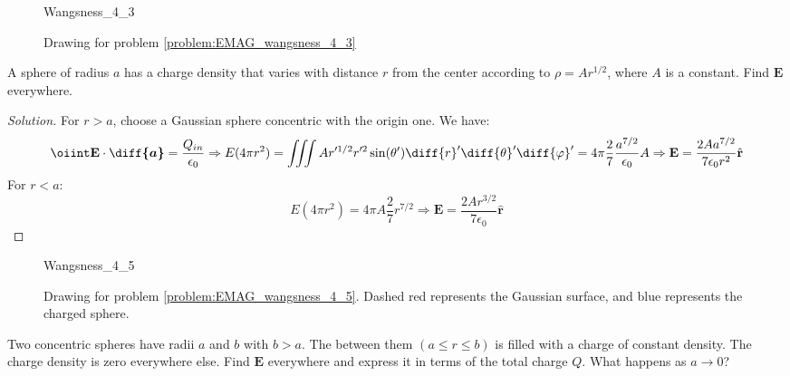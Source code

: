 \documentclass[crop=false,class=article,oneside]{standalone}
\begin{document}
    \begin{figure}
        \centering
        \captionsetup{type=figure}
        {Wangsness_4_3}
        \caption[Drawing for Wangsness 4-3]
        {Drawing for problem \ref{problem:EMAG_wangsness_4_3}}
        \label{fig:EMAG_1_Wangsness_4_3}
    \end{figure}
    \begin{problem}[Wangsness 4-5]
        \label{problem:EMAG_wangsness_4_5}
        A sphere of radius $a$ has a charge density that varies
        with distance $r$ from the center according to
        $\rho=Ar^{1/2}$, where $A$ is a constant.
        Find $\mathbf{E}$ everywhere.
    \end{problem}
    \begin{proof}[Solution]
        For $r>a$, choose a Gaussian sphere concentric with
        the origin one. We have:
        \begin{equation*}
            \oiint\mathbf{E}\cdot\boldsymbol{\diff{a}}
            =\frac{Q_{in}}{\epsilon_{0}}\Rightarrow
            E(4\pi r^{2})
            =\iiint{A}r'^{1/2}r'^{2}
            \sin(\theta')\diff{r}'\diff{\theta}'\diff{\varphi}'
            =4\pi\frac{2}{7}\frac{a^{7/2}}{\epsilon_{0}}A
            \Rightarrow\mathbf{E}
            =\frac{2Aa^{7/2}}{7\epsilon_{0}r^{2}}\hat{\mathbf{r}}
        \end{equation*}
        For $r<a$:
        \begin{equation*}
            E(4\pi r^{2})
            =4\pi A\frac{2}{7}r^{7/2}\Rightarrow
            \mathbf{E}
            =\frac{2Ar^{3/2}}{7\epsilon_{0}}\hat{\mathbf{r}}
        \end{equation*}
    \end{proof}
    \begin{figure}[H]
        \centering
        \captionsetup{type=figure}
        {Wangsness_4_5}
        \caption[Drawing for Wangsness 4-3]{%
            Drawing for problem \ref{problem:EMAG_wangsness_4_5}.
            Dashed red represents the Gaussian surface,
            and blue represents the charged sphere.
        }
        \label{fig:EMAG_1_Wangsness_4_5}
    \end{figure}
    \begin{problem}[Wangsness 4-6]
        Two concentric spheres have radii $a$ and $b$ with $b>a$.
        The between them $(a\leq{r}\leq{b})$ is filled with a
        charge of constant density. The charge density is zero
        everywhere else. Find $\mathbf{E}$ everywhere and express
        it in terms of the total charge $Q$.
        What happens as $a\rightarrow{0}$?
    \end{problem}
\end{document}
